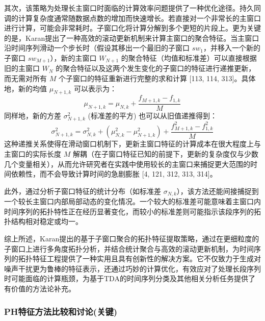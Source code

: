         其次，该策略为处理长主窗口时面临的计算效率问题提供了一种优化途径。持久同调的计算复杂度通常随数据点数的增加而快速增长。若直接对一个非常长的主窗口进行计算，可能会非常耗时。子窗口化将计算分解到多个更短的片段上。更为关键的是，Karan提出了一种高效的滚动更新机制来计算主窗口的聚合特征。当主窗口沿时间序列滑动一个步长时（假设其移出一个最旧的子窗口 $sw_1$，并移入一个新的子窗口 $sw_{M+1}$），新的主窗口 $W_{N+1}$ 的聚合特征（均值和标准差）可以直接根据旧的主窗口 $W_N$ 的聚合特征以及这两个发生变化的子窗口的特征进行递推更新，而无需对所有 $M$ 个子窗口的特征重新进行完整的求和计算 [113, 114, 313]。具体地，新的均值 $\mu_{N+1,k}$ 可以表示为：
        \begin{equation}
            \mu_{N+1,k} = \mu_{N,k} + \frac{f_{M+1,k} - f_{1,k}}{M}
            \label{eq:recursive_mean}
        \end{equation}
        同样地，新的方差 $\sigma_{N+1,k}^2$ (标准差的平方) 也可以从旧值递推得到：
        \begin{equation}
            \sigma_{N+1,k}^2 = \sigma_{N,k}^2 + (\mu_{N,k}^2 - \mu_{N+1,k}^2) + \frac{f_{M+1,k}^2 - f_{1,k}^2}{M}
            \label{eq:recursive_variance}
        \end{equation}
        这种递推关系使得在滑动窗口机制下，更新主窗口特征的计算成本在很大程度上与主窗口的实际长度 $M$ 解耦（在子窗口特征已知的前提下，更新的复杂度仅与少数几个变量相关），从而允许研究者在实践中使用较长的主窗口来捕捉更大范围的时间依赖性，而不会导致计算时间的急剧膨胀 [4, 121, 312, 313, 314]。
        
        此外，通过分析子窗口特征的统计分布（如标准差 $\sigma_{N,k}$），该方法还能间接捕捉到一个较长主窗口内部局部动态的变化情况。一个较大的标准差可能意味着主窗口内时间序列的拓扑特性正在经历显著变化，而较小的标准差则可能指示该段序列的拓扑结构相对稳定或均一。
        
        综上所述，Karan提出的基于子窗口聚合的拓扑特征提取策略，通过在更细粒度的子窗口上进行多角度拓扑分析，并结合统计聚合与高效的滚动更新机制，为时间序列的拓扑特征工程提供了一种实用且具有创新性的解决方案。它不仅致力于生成对噪声干扰更为鲁棒的特征表示，还通过巧妙的计算优化，有效应对了处理长段序列时可能面临的计算瓶颈，为基于TDA的时间序列分类及其他相关分析任务提供了有价值的方法论补充。
        
        \subsubsection{PH特征方法比较和讨论(关键)}
    

